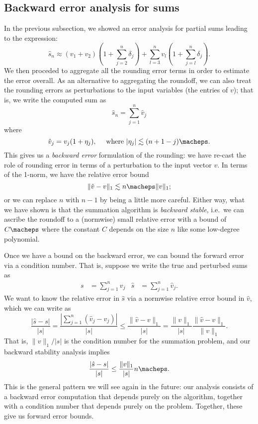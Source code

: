 \subsection{Backward error analysis for sums}

In the previous subsection, we showed an error analysis for partial sums
leading to the expression:
\[
  \hat{s}_n \approx (v_1 + v_2) \left(1 + \sum_{j=2}^n \delta_j \right)
              + \sum_{l=3}^n v_l \left( 1 + \sum_{j=l}^n \delta_j \right).
\]
We then proceded to aggregate all the rounding error terms in order to
estimate the error overall.  As an alternative to aggregating the roundoff,
we can also treat the rounding errors as perturbations to the input
variables (the entries of $v$); that is, we write the computed sum as
\[
  \hat{s}_n = \sum_{j=1}^n \hat{v}_j
\]
where
\[
  \hat{v}_j = v_j (1+\eta_j), \quad
  \mbox{ where }|\eta_j| \lesssim (n+1-j) \macheps.
\]
This gives us a {\em backward error} formulation of the rounding:
we have re-cast the role of rounding error in terms of a
perturbation to the input vector $v$.  In terms of the 1-norm,
we have the relative error bound
\[
  \|\hat{v}-v\|_1 \lesssim n \macheps \|v\|_1;
\]
or we can replace $n$ with $n-1$ by being a little more careful.
Either way, what we have shown is that the summation algorithm
is {\em backward stable}, i.e.~we can ascribe the roundoff to
a (normwise) small relative error with a bound of $C \macheps$
where the constant $C$ depends on the size $n$ like some low-degree
polynomial.

Once we have a bound on the backward error, we can bound the forward
error via a condition number.  That is, suppose we write the true
and perturbed sums as
\begin{align*}
  s &= \sum_{j=1}^n v_j &
  \hat{s} &= \sum_{j=1}^n \hat{v}_j.
\end{align*}
We want to know the relative error in $\hat{s}$ via a normwise
relative error bound in $\hat{v}$, which we can write as
\[
  \frac{|\hat{s}-s|}{|s|} =
  \frac{|\sum_{j=1}^n (\hat{v}_j-v_j)|}{|s|} \leq
  \frac{\|\hat{v}-v\|_1}{|s|} =
  \frac{\|v\|_1}{|s|} \frac{\|\hat{v}-v\|_1}{\|v\|_1}.
\]
That is, $\|v\|_1/|s|$ is the condition number for the summation
problem, and our backward stability analysis implies
\[
  \frac{|\hat{s}-s|}{|s|} \leq
  \frac{\|v\|_1}{|s|} n \macheps.
\]
This is the general pattern we will see again in the future:
our analysis consists of a backward error computation that depends
purely on the algorithm, together with a condition number that depends
purely on the problem.  Together, these give us forward error bounds.

